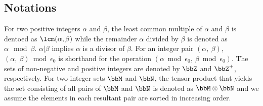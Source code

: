 \subsection{Notations}

For two positive integers $\alpha$ and $\beta$, the least common multiple of $\alpha$ and $\beta$ is dentoed as $\lcm(\alpha,\beta)$ while the remainder $\alpha$ divided by $\beta$ is denoted as $\alpha \mod \beta$. $\alpha | \beta$ implies $\alpha$ is a divisor of $\beta$. For an integer pair $(\alpha,~\beta)$, $(\alpha,~\beta) \bmod \epsilon_0$ is shorthand for the operation $(\alpha \bmod \epsilon_0,~\beta \bmod \epsilon_0)$. The sets of non-negative and positive integers are denoted by $\bbZ$ and $\bbZ^+$, respectively. For two integer sets $\bbM$ and $\bbN$, the tensor product that yields the set consisting of all pairs of $\bbM$ and $\bbN$ is denoted as $\bbM \otimes \bbN$ and we assume the elements in each resultant pair are sorted in increasing order. 


